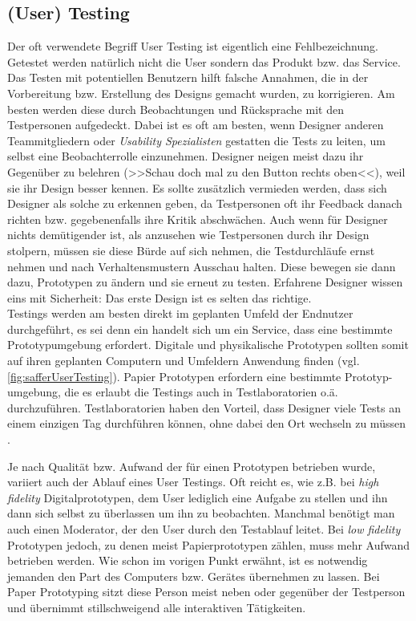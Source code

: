 \subsection{(User) Testing}  
Der oft verwendete Begriff User Testing ist eigentlich eine Fehlbezeichnung. Getestet werden natürlich nicht die User sondern das Produkt bzw. das Service. 
Das Testen mit potentiellen Benutzern hilft falsche Annahmen, die in der Vorbereitung bzw. Erstellung des Designs gemacht wurden, zu korrigieren. Am besten werden diese durch Beobachtungen und Rücksprache mit den Testpersonen aufgedeckt. Dabei ist es oft am besten, wenn Designer anderen Teammitgliedern oder \emph{Usability Spezialisten} gestatten die Tests zu leiten, um selbst eine Beobachterrolle einzunehmen. Designer neigen meist dazu ihr Gegenüber zu belehren (>>Schau doch mal zu den Button rechts oben<<), weil sie ihr Design besser kennen. Es sollte zusätzlich vermieden werden, dass sich Designer als solche zu erkennen geben, da Testpersonen oft ihr Feedback danach richten bzw. gegebenenfalls ihre Kritik abschwächen. Auch wenn für Designer nichts demütigender ist, als anzusehen wie Testpersonen durch ihr Design stolpern, müssen sie diese Bürde auf sich nehmen, die Testdurchläufe ernst nehmen und nach Verhaltensmustern Ausschau halten.  Diese bewegen sie dann dazu, Prototypen zu ändern und sie erneut zu testen. Erfahrene Designer wissen eins mit Sicherheit: Das erste Design ist es selten das richtige. \\
Testings werden am besten direkt im geplanten Umfeld der Endnutzer durchgeführt, es sei denn ein handelt sich um ein Service, dass eine bestimmte Prototypumgebung erfordert. Digitale und physikalische Prototypen sollten somit auf ihren geplanten Computern und Umfeldern Anwendung finden (vgl. \autoref{fig:safferUserTesting}). Papier Prototypen erfordern eine bestimmte Prototyp-umgebung, die es erlaubt die Testings auch in Testlaboratorien o.ä. durchzuführen. Testlaboratorien haben den Vorteil, dass Designer viele Tests an einem einzigen Tag durchführen können, ohne dabei den Ort wechseln zu müssen \citep{Saffer:2007}.

\medskip Je nach Qualität bzw. Aufwand der für einen Prototypen betrieben wurde, variiert auch der Ablauf eines User Testings. Oft reicht es, wie z.B. bei \emph{high fidelity} Digitalprototypen, dem User lediglich eine Aufgabe zu stellen und ihn dann sich selbst zu überlassen um ihn zu beobachten. Manchmal benötigt man auch einen Moderator, der den User durch den Testablauf leitet. Bei \emph{low fidelity} Prototypen jedoch, zu denen meist Papierprototypen zählen, muss mehr Aufwand betrieben werden. Wie schon im vorigen Punkt erwähnt, ist es notwendig jemanden den Part des Computers bzw. Gerätes übernehmen zu lassen. Bei Paper Prototyping sitzt diese Person meist neben oder gegenüber der Testperson und übernimmt stillschweigend alle interaktiven Tätigkeiten.

